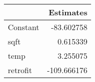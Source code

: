 \begin{tabular}{lr}
\toprule
{} &   Estimates \\
\midrule
Constant &  -83.602758 \\
sqft     &    0.615339 \\
temp     &    3.255075 \\
retrofit & -109.666176 \\
\bottomrule
\end{tabular}
